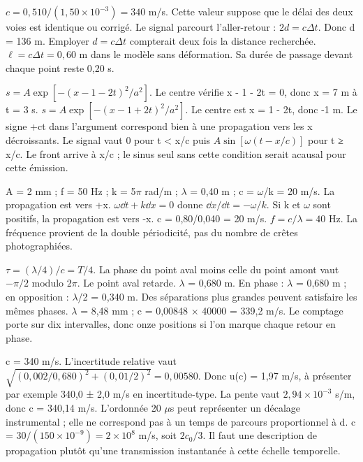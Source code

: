 $c=0{,}510/(1{,}50\times10^{-3})=340$ m/s. Cette valeur suppose que le délai des deux voies est identique ou corrigé.
Le signal parcourt l’aller-retour : $2d=c\Delta t$. Donc d = 136 m. Employer $d=c\Delta t$ compterait deux fois la distance recherchée.
$\ell=c\Delta t=0{,}60$ m dans le modèle sans déformation. Sa durée de passage devant chaque point reste 0,20 s.


$s=A\exp[-(x-1-2t)^2/a^2]$. Le centre vérifie x - 1 - 2t = 0, donc x = 7 m à t = 3 s.
$s=A\exp[-(x-1+2t)^2/a^2]$. Le centre est x = 1 - 2t, donc -1 m. Le signe +ct dans l’argument correspond bien à une propagation vers les x décroissants.
Le signal vaut 0 pour t < x/c puis $A\sin[\omega(t-x/c)]$ pour t ≥ x/c. Le front arrive à x/c ; le sinus seul sans cette condition serait acausal pour cette émission.


A = 2 mm ; f = 50 Hz ; k = 5\ensuremath{\pi} rad/m ; \ensuremath{\lambda} = 0,40 m ; c = \ensuremath{\omega}/k = 20 m/s. La propagation est vers +x.
$\omega\dd t+k\dd x=0$ donne $\dd x/\dd t=-\omega/k$. Si k et \ensuremath{\omega} sont positifs, la propagation est vers -x.
c = 0,80/0,040 = 20 m/s. $f=c/\lambda=40$ Hz. La fréquence provient de la double périodicité, pas du nombre de crêtes photographiées.


$\tau=(\lambda/4)/c=T/4$. La phase du point aval moins celle du point amont vaut $-\pi/2$ modulo $2\pi$. Le point aval retarde.
\ensuremath{\lambda} = 0,680 m. En phase : \ensuremath{\lambda} = 0,680 m ; en opposition : \ensuremath{\lambda}/2 = 0,340 m. Des séparations plus grandes peuvent satisfaire les mêmes phases.
\ensuremath{\lambda} = 8,48 mm ; c = 0,00848 × 40000 = 339,2 m/s. Le comptage porte sur dix intervalles, donc onze positions si l’on marque chaque retour en phase.


c = 340 m/s. L’incertitude relative vaut $\sqrt{(0{,}002/0{,}680)^2+(0{,}01/2)^2}=0{,}00580$. Donc u(c) = 1,97 m/s, à présenter par exemple 340,0 ± 2,0 m/s en incertitude-type.
La pente vaut $2{,}94\times10^{-3}$ s/m, donc c = 340,14 m/s. L’ordonnée 20 \ensuremath{\mu}s peut représenter un décalage instrumental ; elle ne correspond pas à un temps de parcours proportionnel à d.
c = $30/(150\times10^{-9})=2\times10^8$ m/s, soit $2c_0/3$. Il faut une description de propagation plutôt qu’une transmission instantanée à cette échelle temporelle.


